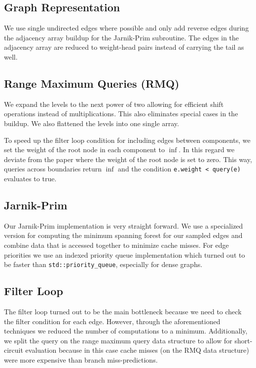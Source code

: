 \documentclass{article}
\begin{document}
\subsection{Graph Representation}
We use single undirected edges where possible and only add reverse edges during the adjacency array buildup for the Jarnik-Prim subroutine.
The edges in the adjacency array are reduced to weight-head pairs instead of carrying the tail as well.

\subsection{Range Maximum Queries (RMQ)}
We expand the levels to the next power of two allowing for efficient shift operations instead of multiplications.
This also eliminates special cases in the buildup. We also flattened the levels into one single array.

To speed up the filter loop condition for including edges between components, we set the weight of the root node in each component to $\inf$.
In this regard we deviate from the paper where the weight of the root node is set to zero.
This way, queries across boundaries return $\inf$ and the condition \texttt{e.weight < query(e)} evaluates to true.

\subsection{Jarnik-Prim}
Our Jarnik-Prim implementation is very straight forward. We use a specialized version for computing the minimum spanning forest for our sampled edges and combine data that is accessed together to minimize cache misses. For edge priorities we use an indexed priority queue implementation which turned out to be faster than \texttt{std::priority\_queue}, especially for dense graphs.

\subsection{Filter Loop}
The filter loop turned out to be the main bottleneck because we need to check the filter condition for each edge. However, through the aforementioned techniques we reduced the number of computations to a minimum. Additionally, we split the query on the range maximum query data structure to allow for short-circuit evaluation because in this case cache misses (on the RMQ data structure) were more expensive than branch miss-predictions.
\end{document}

